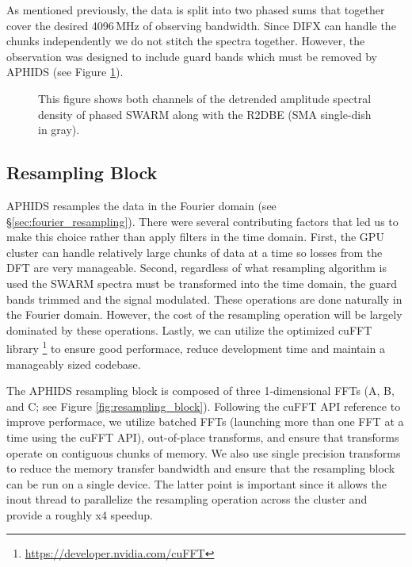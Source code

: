 As mentioned previously, the data is split into two phased sums that together cover the desired 4096\,MHz of 
observing bandwidth.  Since DIFX can handle the chunks independently we do not stitch the spectra together. 
However, the observation was designed to include guard bands which must be removed by APHIDS 
(see Figure \ref{fig:swarm_amp_spec}).

\begin{figure}[t!]
\caption{This figure shows both channels of the detrended amplitude spectral density of phased SWARM along with 
the R2DBE (SMA single-dish in gray).}
\label{fig:swarm_amp_spec}
\end{figure}

\subsection{Resampling Block}\label{sec:resamp_block}

APHIDS resamples the data in the Fourier domain (see \S \ref{sec:fourier_resampling}).  There were several 
contributing factors that led us to make
this choice rather than apply filters in the time domain.  First, the GPU cluster can handle relatively large 
chunks of data at a time so losses from the DFT are very manageable.  Second, regardless of 
what resampling algorithm is used the SWARM spectra must 
be transformed into the time domain, the guard bands trimmed and the signal modulated.  These operations are done 
naturally in the Fourier domain.  However, the cost of the resampling operation will be largely dominated by 
these operations.  Lastly, we can utilize the optimized cuFFT library
\footnote{\url{https://developer.nvidia.com/cuFFT}} to ensure good performace, reduce development time and 
maintain a manageably sized codebase.

The APHIDS resampling block is composed of three 1-dimensional FFTs (A, B, and C; see Figure 
\ref{fig:resampling_block}).  Following the cuFFT API reference to improve performace, we utilize batched
FFTs (launching more than one FFT at a time using the cuFFT API), out-of-place transforms, 
and ensure that transforms operate on contiguous chunks of memory.  We also use single precision transforms to 
reduce the memory transfer bandwidth and ensure that 
the resampling block can be run on a single device.  The latter point is important since it allows the inout
thread to parallelize the resampling operation across the cluster and provide a roughly x4 speedup.


